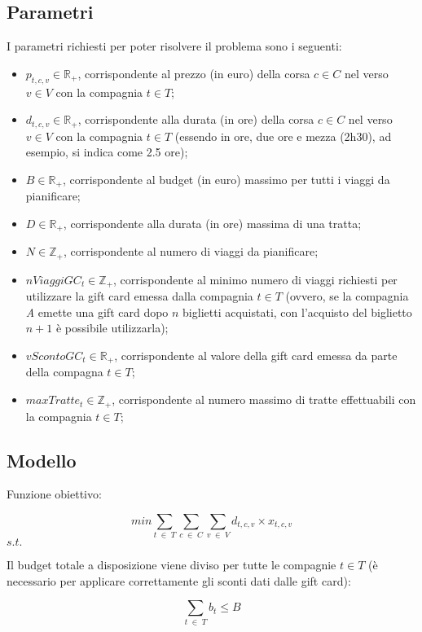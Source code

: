 \documentclass[main.tex]{subfiles}
\begin{document}
\subsection{Parametri}
I parametri richiesti per poter risolvere il problema sono i seguenti:
\begin{itemize}
    \item $p_{t,c,v} \in \mathbb{R}_+$, corrispondente al prezzo (in euro) della corsa $c \in C$ nel verso $v \in V$ con la compagnia $t \in T$;
    \item $d_{t,c,v} \in \mathbb{R}_+$, corrispondente alla durata (in ore) della corsa $c \in C$ nel verso $v \in V$ con la compagnia $t \in T$ (essendo in ore, due ore e mezza (2h30), ad esempio, si indica come 2.5 ore);
    \item $B \in \mathbb{R}_+$, corrispondente al budget (in euro) massimo per tutti i viaggi da pianificare;
    \item $D \in \mathbb{R}_+$, corrispondente alla durata (in ore) massima di una tratta;
    \item $N \in \mathbb{Z}_+$, corrispondente al numero di viaggi da pianificare;
    \item $nViaggiGC_t \in \mathbb{Z}_+$, corrispondente al minimo numero di viaggi richiesti per utilizzare la gift card emessa dalla compagnia $t \in T$
    (ovvero, se la compagnia \textit{A} emette una gift card dopo $n$ biglietti acquistati, con l'acquisto del biglietto $n+1$ è possibile utilizzarla);
    \item $vScontoGC_t \in \mathbb{R}_+$, corrispondente al valore della gift card emessa da parte della compagna $t \in T$;
    \item $maxTratte_t \in \mathbb{Z}_+$, corrispondente al numero massimo di tratte effettuabili con la compagnia $t \in T$;
\end{itemize}

\subsection{Modello}
\setlength{\parindent}{0em}
Funzione obiettivo:
\begin{tcolorbox}
$$min \sum_{t\; \in\; T} \sum_{c\; \in\; C} \sum_{v\; \in\; V} d_{t,c,v} \times{} x_{t,c,v}$$
$s.t.$
\end{tcolorbox}

Il budget totale a disposizione viene diviso per tutte le compagnie $t \in T$ (è necessario per applicare correttamente gli sconti dati dalle gift card):
\begin{tcolorbox}
$$\sum_{t\; \in\; T} b_t \leq B$$
\end{tcolorbox}
\end{document}
